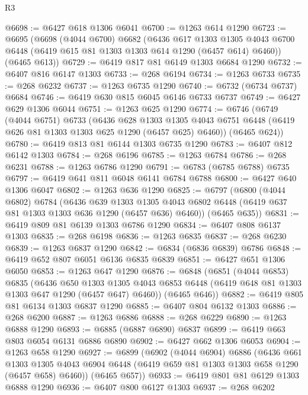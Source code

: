\begin{lexlean}{R3}
\begin{coremodule}
@6698 := @6427 @618 @1306 @6041
@6700 := @1263 @614 @1290
@6723 := @6695
    (@6698
      (@4044 @6700)
      @6682
      (@6436
        @617
        @1303
        @1305
        @4043
        @6700
        @6448
        (@6419 @615 @81 @1303 @1303 @614 @1290 (@6457 @614) @6460))
      (@6465 @613))
@6729 := @6419 @817 @81 @6149 @1303 @6684 @1290
@6732 := @6407 @816 @6147 @1303
@6733 := @268 @6194
@6734 := @1263 @6733
@6735 := @268 @6232
@6737 := @1263 @6735 @1290
@6740 := @6732 (@6734 @6737) @6684
@6746 := @6419 @630 @815 @6045 @6146 @6733 @6737
@6749 := @6427 @629 @1306 @6044
@6751 := @1263 @625 @1290
@6774 := @6746
    (@6749
      (@4044 @6751)
      @6733
      (@6436
        @628
        @1303
        @1305
        @4043
        @6751
        @6448
        (@6419 @626 @81 @1303 @1303 @625 @1290 (@6457 @625) @6460))
      (@6465 @624))
@6780 := @6419 @813 @81 @6144 @1303 @6735 @1290
@6783 := @6407 @812 @6142 @1303
@6784 := @268 @6196
@6785 := @1263 @6784
@6786 := @268 @6231
@6788 := @1263 @6786 @1290
@6791 := @6783 (@6785 @6788) @6735
@6797 := @6419 @641 @811 @6048 @6141 @6784 @6788
@6800 := @6427 @640 @1306 @6047
@6802 := @1263 @636 @1290
@6825 := @6797
    (@6800
      (@4044 @6802)
      @6784
      (@6436
        @639
        @1303
        @1305
        @4043
        @6802
        @6448
        (@6419 @637 @81 @1303 @1303 @636 @1290 (@6457 @636) @6460))
      (@6465 @635))
@6831 := @6419 @809 @81 @6139 @1303 @6786 @1290
@6834 := @6407 @808 @6137 @1303
@6835 := @268 @6198
@6836 := @1263 @6835
@6837 := @268 @6230
@6839 := @1263 @6837 @1290
@6842 := @6834 (@6836 @6839) @6786
@6848 := @6419 @652 @807 @6051 @6136 @6835 @6839
@6851 := @6427 @651 @1306 @6050
@6853 := @1263 @647 @1290
@6876 := @6848
    (@6851
      (@4044 @6853)
      @6835
      (@6436
        @650
        @1303
        @1305
        @4043
        @6853
        @6448
        (@6419 @648 @81 @1303 @1303 @647 @1290 (@6457 @647) @6460))
      (@6465 @646))
@6882 := @6419 @805 @81 @6134 @1303 @6837 @1290
@6885 := @6407 @804 @6132 @1303
@6886 := @268 @6200
@6887 := @1263 @6886
@6888 := @268 @6229
@6890 := @1263 @6888 @1290
@6893 := @6885 (@6887 @6890) @6837
@6899 := @6419 @663 @803 @6054 @6131 @6886 @6890
@6902 := @6427 @662 @1306 @6053
@6904 := @1263 @658 @1290
@6927 := @6899
    (@6902
      (@4044 @6904)
      @6886
      (@6436
        @661
        @1303
        @1305
        @4043
        @6904
        @6448
        (@6419 @659 @81 @1303 @1303 @658 @1290 (@6457 @658) @6460))
      (@6465 @657))
@6933 := @6419 @801 @81 @6129 @1303 @6888 @1290
@6936 := @6407 @800 @6127 @1303
@6937 := @268 @6202

\end{coremodule}
\end{lexlean}
